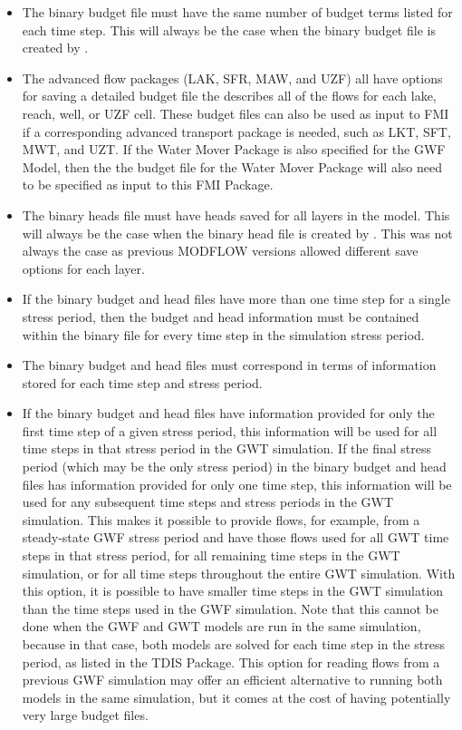 \begin{itemize}
\begin{itemize}
\begin{verbatim}
BEGIN OPTIONS
  HEAD FILEOUT mymodel.hds
  BUDGET FILEOUT mymodel.bud
END OPTIONS

BEGIN PERIOD 1
  SAVE HEAD ALL
  SAVE BUDGET ALL
END PERIOD
\end{verbatim}

\item The binary budget file must have the same number of budget terms listed for each time step.  This will always be the case when the binary budget file is created by \mf.
\item The advanced flow packages (LAK, SFR, MAW, and UZF) all have options for saving a detailed budget file the describes all of the flows for each lake, reach, well, or UZF cell.  These budget files can also be used as input to FMI if a corresponding advanced transport package is needed, such as LKT, SFT, MWT, and UZT.  If the Water Mover Package is also specified for the GWF Model, then the the budget file for the Water Mover Package will also need to be specified as input to this FMI Package.
\item The binary heads file must have heads saved for all layers in the model.  This will always be the case when the binary head file is created by \mf.  This was not always the case as previous MODFLOW versions allowed different save options for each layer.
\item If the binary budget and head files have more than one time step for a single stress period, then the budget and head information must be contained within the binary file for every time step in the simulation stress period.
\item The binary budget and head files must correspond in terms of information stored for each time step and stress period.
\item If the binary budget and head files have information provided for only the first time step of a given stress period, this information will be used for all time steps in that stress period in the GWT simulation. If the final stress period (which may be the only stress period) in the binary budget and head files has information provided for only one time step, this information will be used for any subsequent time steps and stress periods in the GWT simulation. This makes it possible to provide flows, for example, from a steady-state GWF stress period and have those flows used for all GWT time steps in that stress period, for all remaining time steps in the GWT simulation, or for all time steps throughout the entire GWT simulation. With this option, it is possible to have smaller time steps in the GWT simulation than the time steps used in the GWF simulation. Note that this cannot be done when the GWF and GWT models are run in the same simulation, because in that case, both models are solved for each time step in the stress period, as listed in the TDIS Package. This option for reading flows from a previous GWF simulation may offer an efficient alternative to running both models in the same simulation, but it comes at the cost of having potentially very large budget files.

\end{itemize}
\end{itemize}
